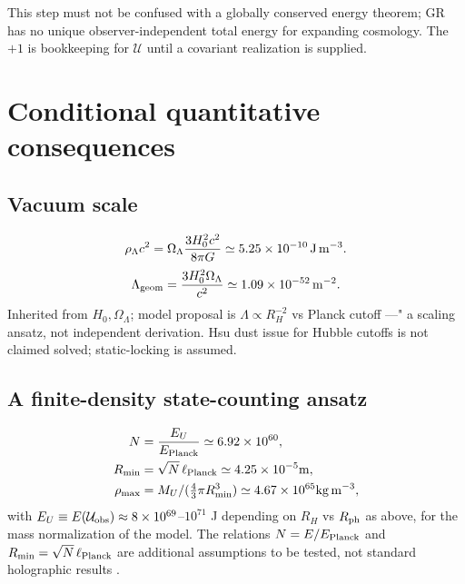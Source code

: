 \documentclass[twocolumn]{aastex631}
\begin{document}
This step must not be confused with a globally conserved energy theorem; GR has no unique observer-independent total energy for expanding cosmology. The $+1$ is bookkeeping for $\mathcal U$ until a covariant realization is supplied.

\section{Conditional quantitative consequences}

\subsection{Vacuum scale}

\begin{equation}
\rho_{\Lambda}c^{2}=\Omega_{\Lambda}\frac{3H_{0}^{2}c^{2}}{8\pi G}\simeq5.25\times10^{-10}\,{\rm J\,m^{-3}}.
\end{equation}
\begin{equation}
\Lambda_{\rm geom}=\frac{3H_{0}^{2}\Omega_{\Lambda}}{c^{2}}\simeq1.09\times10^{-52}\,{\rm m^{-2}}.
\end{equation}
Inherited from $H_{0},\Omega_{\Lambda}$; model proposal is $\Lambda\propto R_{H}^{-2}$ vs Planck cutoff ---" a scaling ansatz, not independent derivation. Hsu dust issue for Hubble cutoffs \cite{Hsu2004} is not claimed solved; static-locking is assumed.

\subsection{A finite-density state-counting ansatz}

\begin{align*}
N&=\frac{E_{U}}{E_{\rm Planck}}\simeq6.92\times10^{60},\\
R_{\min}&=\sqrt N\,\ell_{\rm Planck}\simeq4.25\times10^{-5}{\rm m},\\
\rho_{\max}&=M_{U}/(\tfrac43\pi R_{\min}^{3})\simeq4.67\times10^{65}{\rm kg\,m^{-3}},
\end{align*}
with $E_{U}\equiv E(\mathcal U_{\rm obs})\approx8\times10^{69}$--$10^{71}$ J depending on $R_{H}$ vs $R_{\rm ph}$ as above, for the mass normalization of the model. The relations $N=E/E_{\rm Planck}$ and $R_{\min}=\sqrt N\,\ell_{\rm Planck}$ are additional assumptions to be tested, not standard holographic results \cite{Bekenstein1981,tHooft1993,Susskind1995}.
\end{document}
